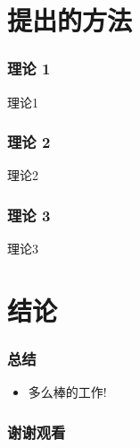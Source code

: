 \documentclass{beamer}
\begin{document}
	\section{提出的方法}
		\begin{frame}
			\frametitle{理论 1}
				理论1
		\end{frame}

		\begin{frame}
			\frametitle{理论 2}
				理论2
		\end{frame}

		\begin{frame}
			\frametitle{理论 3}
			理论3
		\end{frame}

	\section{结论}
		\begin{frame}
			\frametitle{总结}
			\begin{itemize}
				\item 多么棒的工作!
			\end{itemize}
		\end{frame}
	
	\appendix
	\backupbegin
	  \begin{frame}
	    \frametitle{谢谢观看}
	  \end{frame}
	\backupend
\end{document}
